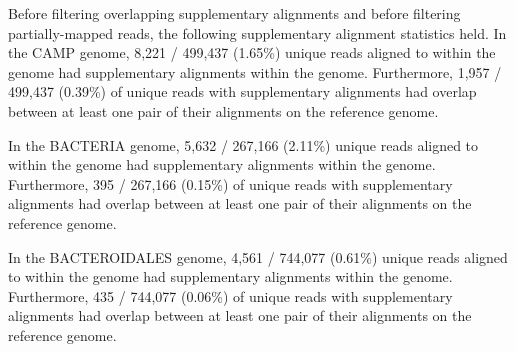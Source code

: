 Before filtering overlapping supplementary alignments and before filtering
partially-mapped reads, the following supplementary alignment statistics held.
In the CAMP genome, 8,221 / 499,437 (1.65\%) unique reads aligned to within the genome had supplementary alignments within the genome.
 Furthermore, 1,957 / 499,437 (0.39\%) of unique reads with supplementary alignments had overlap between at least one pair of their alignments on the reference genome.

In the BACTERIA genome, 5,632 / 267,166 (2.11\%) unique reads aligned to within the genome had supplementary alignments within the genome.
 Furthermore, 395 / 267,166 (0.15\%) of unique reads with supplementary alignments had overlap between at least one pair of their alignments on the reference genome.

In the BACTEROIDALES genome, 4,561 / 744,077 (0.61\%) unique reads aligned to within the genome had supplementary alignments within the genome.
 Furthermore, 435 / 744,077 (0.06\%) of unique reads with supplementary alignments had overlap between at least one pair of their alignments on the reference genome.
\endinput